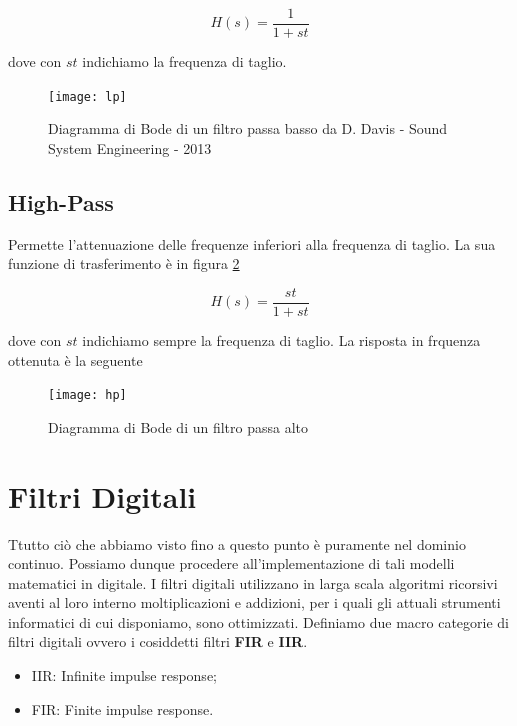 \begin{equation}
H(s)=\frac{1}{1+st}
\end{equation}

dove con $st$ indichiamo la frequenza di taglio.

\begin{figure}[h]
\centering
\texttt{[image: lp]}
\caption{Diagramma di Bode di un filtro passa basso \newline \scriptsize{ da D. Davis - Sound System Engineering - 2013}}
\label{fig:lp}
\end{figure}

\subsection{High-Pass}

Permette l’attenuazione delle frequenze inferiori alla frequenza di taglio.
La sua funzione di trasferimento è in figura \ref{fig:hp}

\begin{equation}
H(s)=\frac{st}{1+st}
\end{equation}

dove con $st$ indichiamo sempre la frequenza di taglio.
La risposta in frquenza ottenuta è la seguente

\begin{figure}[htp]
\centering
\texttt{[image: hp]}
\caption{Diagramma di Bode di un filtro passa alto}
\label{fig:hp}
\end{figure}

\section{Filtri Digitali}

Ttutto ciò che abbiamo visto fino a questo punto è puramente nel dominio
continuo. Possiamo dunque procedere all’implementazione di tali modelli
matematici in digitale. I filtri digitali utilizzano in larga scala algoritmi
ricorsivi aventi al loro interno moltiplicazioni e addizioni, per i quali gli
attuali strumenti informatici di cui disponiamo, sono ottimizzati. Definiamo
due macro categorie di filtri digitali ovvero i cosiddetti filtri \textbf{FIR}
e \textbf{IIR}.

\begin{itemize}
\item IIR: Infinite impulse response;
\item FIR: Finite impulse response.
\end{itemize}


